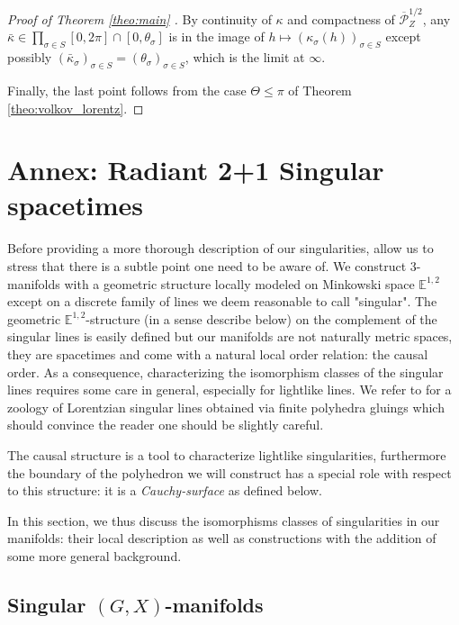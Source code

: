 \documentclass[a4paper,12pt]{article}
\newcommand{\mass}[1]{{\mathbb E}^{1,2}_{#1}}
\def\P{\mathcal{P}}
\theoremstyle{definition}
\begin{document}
\begin{proof}[Proof of Theorem \ref{theo:main} ]
				  By continuity of $\kappa$ and compactness of $\overline{\P}_Z^{1/2}$,  any $\bar\kappa \in \prod_{\sigma \in S}[0,2\pi]\cap [0,\theta_\sigma]$ is in the image of $h\mapsto (\kappa_\sigma(h))_{\sigma\in S}$ except possibly $(\bar\kappa_{\sigma})_{\sigma\in S}=(\theta_\sigma)_{\sigma \in S}$, which is the limit at $\infty$. 
				  
				  Finally, the last point follows from the case $\Theta\leq \pi$ of Theorem \ref{theo:volkov_lorentz}.
			\end{proof}
			
	
	\section{Annex: Radiant 2+1 Singular spacetimes}

	
		
		Before providing a more thorough description of our singularities, allow us to stress that there is a subtle point one need to be aware of. We construct 3-manifolds with a geometric structure locally modeled on Minkowski space $\mass{}$ except on a discrete family of lines we deem reasonable to call "singular". The geometric $\mass{}$-structure (in a sense describe below) on the complement of the singular lines is easily defined but our manifolds are not naturally metric spaces, they are spacetimes and come with a natural local order relation: the causal order. As a consequence, characterizing the isomorphism classes of the singular lines requires some care in general, especially for lightlike lines. We refer to \cite{Particules_1} for a zoology of Lorentzian singular lines obtained via finite polyhedra gluings which should convince the reader one should be slightly careful.
		
		The causal structure is a tool to characterize lightlike singularities, furthermore the boundary of the polyhedron we will construct has a special role with respect to this structure: it is a {\it Cauchy-surface} as defined below.
		
		In this section, we thus discuss the isomorphisms classes of singularities in our manifolds: their local description as well as constructions with the addition of some more general background. 
		
		
		
		
		
		\subsection{Singular $(G,X)$-manifolds}
		
\end{document}
